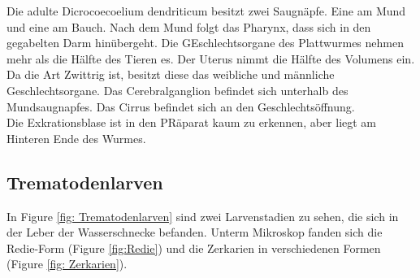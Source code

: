 \documentclass[oneside,10pt,a4paper]{report}
\begin{document}
				Die adulte Dicrocoecoelium dendriticum besitzt zwei Saugnäpfe. Eine am Mund und eine am Bauch. Nach dem Mund folgt das Pharynx, dass sich in den gegabelten Darm hinübergeht. Die GEschlechtsorgane des Plattwurmes nehmen mehr als die Hälfte des Tieren es. Der Uterus nimmt die Hälfte des Volumens ein. Da die Art Zwittrig ist, besitzt diese das weibliche und männliche Geschlechtsorgane. Das Cerebralganglion befindet sich unterhalb des Mundsaugnapfes. Das Cirrus befindet sich an den Geschlechtsöffnung.\\
				Die Exkrationsblase ist in den PRäparat kaum zu erkennen, aber liegt am Hinteren Ende des Wurmes.
				
			\subsection{Trematodenlarven}
				In Figure \ref{fig: Trematodenlarven} sind zwei Larvenstadien zu sehen, die sich in der Leber der Wasserschnecke befanden. Unterm Mikroskop fanden sich die Redie-Form (Figure \ref{fig:Redie}) und die Zerkarien in verschiedenen Formen (Figure \ref{fig: Zerkarien}).
				
\end{document}
